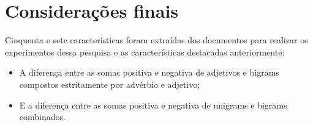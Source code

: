 \documentclass[template.tex]{subfiles}
\begin{document}


\section{Considerações finais}

Cinquenta e sete características foram extraídas dos documentos para realizar os experimentos dessa pesquisa e as características destacadas anteriormente: 

\begin{itemize}
\item A diferença entre as somas positiva e negativa de adjetivos e bigrams compostos estritamente por advérbio e adjetivo;
\item E a diferença entre as somas positiva e negativa de unigrams e bigrams combinados.
\end{itemize}
\end{document}
